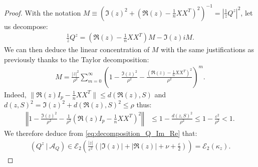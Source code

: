 \documentclass[a4papaer, titlepage]{book}
\begin{document}
\begin{proof}

    With the notation $M \equiv \left( \Im(z)^2 + \left( \Re(z) - \frac{1}{n}XX^T \right)^2 \right)^{-1} = |\frac{1}{z}Q^z|^2$, let us decompose:
    \begin{align}\label{eq:decomposition_Q_Im_Re}
      \frac{1}{z}Q^z = \left( \Re(z) - \frac{1}{n}XX^T \right) M - \Im(z)i M.
    \end{align}
    We can then deduce the linear concentration of $M$ with the same justifications as previously thanks to the Taylor decomposition:
    \begin{align*}
      M 
      = \frac{|z|^2}{\rho^2} \sum_{m=0}^\infty \left( 1 - \frac{\Im(z)^2}{\rho^2} - \frac{\left( \Re(z) - \frac{1}{n}XX^T \right)^2}{\rho^2} \right)^m.
    \end{align*}
    Indeed, $\|\Re(z)I_p - \frac{1}{n}XX^T\| \leq d(\Re(z), S)$ and $d(z, S)^2 = \Im(z)^2 + d(\Re(z), S)^2 \leq \rho$ thus:
    \begin{align*}
      \left\Vert 1 - \frac{\Im(z)^2}{\rho^2}  - \frac{1}{\rho^2}\left(\Re(z)I_p - \frac{1}{n}XX^T\right) ^2\right\Vert 
      & \leq 1 -  \frac{d(z, S)^2}{\rho^2} 
      \leq 1 - \frac{\varepsilon^2}{\rho^2} <1 .
    \end{align*}
  We therefore deduce from \eqref{eq:decomposition_Q_Im_Re} that:
  \begin{align*}
    (Q^z \ | \ \mathcal A_Q) 
    \in \mathcal E_2 \left(\frac{ |z|}{\varepsilon^2} \left( |\Im(z)| + |\Re(z)| + \nu + \frac{\varepsilon}{2} \right)  \right) 
    = \mathcal E_2(\kappa_z).
  \end{align*}
\end{proof}
\end{document}
